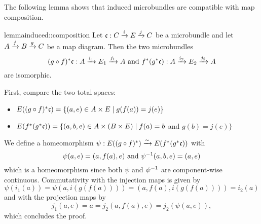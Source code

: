 \begin{myparagraph} The following lemma shows that induced microbundles are compatible with map composition. \end{myparagraph}

\begin{mystatement}{lemma}{induced::composition} Let $\bundledef{\bc}{C}{E}{i}{j}$ be a microbundle and let $A \xto{f} B \xto{g} C$ be a map diagram. Then the two microbundles \[ \bundledef{\ind{(g \circ f)}\bc}{A}{E_1}{i_1}{j_1} \tand \bundledef{\ind{f}(\ind{g}\bc)}{A}{E_2}{i_2}{j_2} \] are isomorphic. \end{mystatement}

\begin{myproof} First, compare the two total spaces: \begin{itemize} \item $E(\ind{(g \circ f)}\bc) = \{ (a, e) \in A \cross E \mid g(f(a)) = j(e)\}$ \item $E(\ind{f}(\ind{g}\bc)) = \{ (a, b, e) \in A \cross (B \cross E) \mid f(a) = b$ and $ g(b) = j(e) \}$ \end{itemize} We define a homeomorphism $\psi: E(\ind{(g \circ f)}) \isomto E(\ind{f}(\ind{g}\bc))$ with \[ \psi(a, e) = (a, f(a), e) \tand \inv{\psi}(a, b, e) = (a, e) \] which is a homeomorphism since both $\psi$ and $\inv{\psi}$ are component-wise continuous. Commutativity with the injection maps is given by \[ \psi(i_1(a)) = \psi(a, i(g(f(a)))) = (a, f(a), i(g(f(a)))) = i_2(a) \] and with the projection maps by \[ j_1(a, e) = a = j_2(a, f(a), e) = j_2(\psi(a, e)), \] which concludes the proof. \end{myproof}